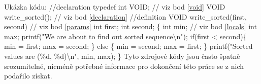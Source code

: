 {Ukázka kódu: \newline
\begingroup
{}\selectfont
//declaration\newline
typedef int VOID;					// viz bod \ref{void}\newline
VOID write\_sorted();				// viz bod \ref{declaration}\newline
\newline
//definition\newline
VOID write\_sorted(first, second)	// viz bod \ref{params}\newline
int first;\newline
int second;\newline
\{\newline
\hspace*{4em}	int min;						// viz bod \ref{locals}\newline
\hspace*{4em}	int max;\newline
\newline
\hspace*{4em}	printf("We are about to find out sorted sequence\textbackslash n");\newline
\newline
\hspace*{4em}	if(first < second)\{\newline
\hspace*{4em}\hspace*{4em}		min = first;\newline
\hspace*{4em}\hspace*{4em}		max = second;\newline
\hspace*{4em}	\} else \{\newline
\hspace*{4em}\hspace*{4em}		min = second;\newline
\hspace*{4em}\hspace*{4em}		max = first;\newline
\hspace*{4em}	\}\newline
\hspace*{4em}	printf("Sorted values are (\%d, \%d)\textbackslash n", min, max);\newline
\}
\endgroup } 
Tyto zdrojové kódy jsou často špatně srozumitelné, nicméně potřebné informace pro dokončení této práce se z nich podařilo získat.

